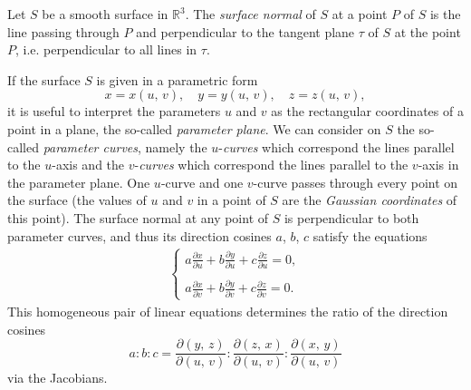 \documentclass[12pt]{article}
\theoremstyle{definition}
\begin{document}
  
Let $S$ be a smooth surface in $\mathbb{R}^3$.  The {\em surface normal} of $S$ at a point $P$ of $S$ is the line passing through $P$ and perpendicular to the tangent plane $\tau$ of $S$ at the point $P$, i.e. perpendicular to all lines in $\tau$.

If the surface $S$ is given in a parametric form
$$x = x(u,\,v),\quad y = y(u,\,v),\quad z = z(u,\,v),$$
it is useful to interpret the parameters $u$ and $v$ as the rectangular coordinates of a point in a plane, the so-called {\em parameter plane}.  We can consider on $S$ the so-called {\em parameter curves}, namely the $u$-{\em curves} which correspond the lines parallel to the $u$-axis and the $v$-{\em curves} which correspond the lines parallel to the $v$-axis in the parameter plane.   One $u$-curve and one $v$-curve passes through every point on the surface (the values of $u$ and $v$ in a point of $S$ are the {\em Gaussian coordinates} of this point).  The surface normal at any point of $S$ is perpendicular to both parameter curves, and thus its direction cosines $a$, $b$, $c$ satisfy the equations
\begin{align*}
\begin{cases}
\displaystyle{a\frac{\partial x}{\partial u}+b\frac{\partial y}{\partial u}+c\frac{\partial z}{\partial u}= 0},\\
\\
\displaystyle{a\frac{\partial x}{\partial v}+b\frac{\partial y}{\partial v}+c\frac{\partial z}{\partial v}= 0.}
\end{cases}
\end{align*}
This homogeneous pair of linear equations determines the ratio of the direction cosines 
$$a:b:c = \frac{\partial(y,\,z)}{\partial(u,\,v)}:\frac{\partial(z,\,x)}{\partial(u,\,v)}:\frac{\partial(x,\,y)}{\partial(u,\,v)}$$
via the Jacobians.\\
\end{document}
